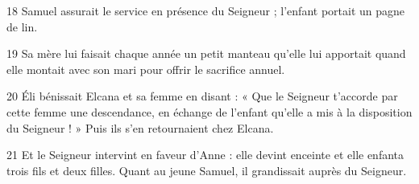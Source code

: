 
18 Samuel assurait le service en présence du Seigneur ; l’enfant portait un pagne de lin.

19 Sa mère lui faisait chaque année un petit manteau qu’elle lui apportait quand elle montait avec son mari pour offrir le sacrifice annuel.

20 Éli bénissait Elcana et sa femme en disant : « Que le Seigneur t’accorde par cette femme une descendance, en échange de l’enfant qu’elle a mis à la disposition du Seigneur ! » Puis ils s’en retournaient chez Elcana.

21 Et le Seigneur intervint en faveur d’Anne : elle devint enceinte et elle enfanta trois fils et deux filles. Quant au jeune Samuel, il grandissait auprès du Seigneur.